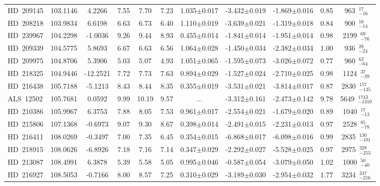 {\begin{longtable}{lcccccccccc}
HD~209145 & 103.1146 & 4.2266 & 7.55 & 7.70 & 7.23 & 1.035$\pm$0.017 & -3.432$\pm$0.019 & -1.869$\pm$0.016 & 0.85 & 963~$_{-16}^{17}$ \\
\noalign{\smallskip}
HD~208218 & 103.9834 & 6.6198 & 6.63 & 6.73 & 6.40 & 1.110$\pm$0.019 & -3.639$\pm$0.021 & -1.319$\pm$0.018 & 0.84 & 900~$_{-14}^{16}$ \\
\noalign{\smallskip}
HD~239967 & 104.2298 & -1.0036 & 9.26 & 9.44 & 8.93 & 0.455$\pm$0.014 & -1.841$\pm$0.014 & -1.951$\pm$0.014 & 0.98 & 2199~$_{-76}^{69}$ \\
\noalign{\smallskip}
HD~209339 & 104.5775 & 5.8693 & 6.67 & 6.63 & 6.56 & 1.064$\pm$0.028 & -1.450$\pm$0.034 & -2.382$\pm$0.034 & 1.00 & 936~$_{-24}^{28}$ \\
\noalign{\smallskip}
HD~209975 & 104.8706 & 5.3906 & 5.03 & 5.07 & 4.93 & 1.051$\pm$0.065 & -1.595$\pm$0.073 & -3.026$\pm$0.072 & 0.77 & 960~$_{-64}^{62}$ \\
\noalign{\smallskip}
HD~218325 & 104.9446 & -12.2521 & 7.72 & 7.73 & 7.63 & 0.894$\pm$0.029 & -1.527$\pm$0.024 & -2.710$\pm$0.025 & 0.98 & 1124~$_{-39}^{37}$ \\
\noalign{\smallskip}
HD~216438 & 105.7188 & -5.1213 & 8.43 & 8.44 & 8.35 & 0.355$\pm$0.019 & -3.531$\pm$0.021 & -3.814$\pm$0.017 & 0.87 & 2830~$_{-135}^{157}$ \\
\noalign{\smallskip}
ALS~12502 & 105.7681 & 0.0592 & 9.99 & 10.19 & 9.57 & ... & -3.312$\pm$0.161 & -2.473$\pm$0.142 & 9.78 & 5649~$_{-1310}^{1743}$ \\
\noalign{\smallskip}
HD~210386 & 105.9967 & 6.3753 & 7.88 & 8.05 & 7.53 & 0.961$\pm$0.017 & -2.554$\pm$0.021 & -1.679$\pm$0.020 & 0.89 & 1040~$_{-13}^{17}$ \\
\noalign{\smallskip}
HD~215806 & 107.1368 & -0.6973 & 9.07 & 9.30 & 8.67 & 0.398$\pm$0.014 & -2.491$\pm$0.015 & -2.231$\pm$0.013 & 0.97 & 2528~$_{-78}^{85}$ \\
\noalign{\smallskip}
HD~216411 & 108.0269 & -0.3497 & 7.00 & 7.35 & 6.45 & 0.354$\pm$0.015 & -6.868$\pm$0.017 & -6.098$\pm$0.016 & 0.99 & 2835~$_{-101}^{130}$ \\
\noalign{\smallskip}
HD~218915 & 108.0626 & -6.8926 & 7.18 & 7.16 & 7.14 & 0.347$\pm$0.029 & -2.292$\pm$0.027 & -5.528$\pm$0.025 & 0.97 & 2975~$_{-253}^{328}$ \\
\noalign{\smallskip}
HD~213087 & 108.4991 & 6.3878 & 5.39 & 5.58 & 5.05 & 0.995$\pm$0.046 & -0.587$\pm$0.054 & -3.079$\pm$0.050 & 1.02 & 1000~$_{-40}^{50}$ \\
\noalign{\smallskip}
HD~216927 & 108.5053 & -0.7166 & 8.00 & 8.57 & 7.25 & 0.310$\pm$0.029 & -3.189$\pm$0.030 & -2.954$\pm$0.032 & 1.77 & 3234~$_{-216}^{247}$ \\

\end{longtable}}
